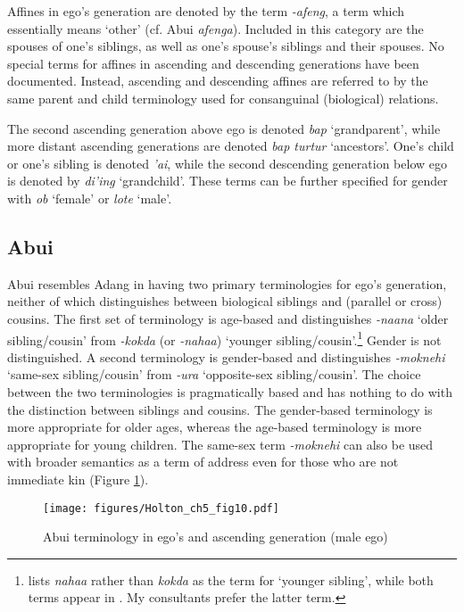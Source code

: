 Affines in ego's generation are denoted by the term \textit{{}-afeng}, a term which essentially means `other' (cf. Abui \textit{afenga}). Included in this category are the spouses of one's siblings, as well as one's spouse's siblings and their spouses. No special terms for affines in ascending and descending generations have been documented. Instead, ascending and descending affines are referred to by the same parent and child terminology used for consanguinal (biological) relations. 

The second ascending generation above ego is denoted \textit{bap} `grandparent', while more distant ascending generations are denoted \textit{bap turtur} `ancestors'. One's  child or one's sibling is denoted \textit{'ai}, while the second descending generation below ego is denoted by \textit{di'ing} `grandchild'. These terms can be further specified for gender with \textit{ob} `female' or \textit{lote} `male'. 

 
\subsection{Abui}\label{sect_abui}
Abui resembles Adang in having two primary terminologies for ego's generation, neither of which distinguishes between biological siblings and (parallel or cross) cousins. The first set of terminology is age-based and distinguishes \textit{-naana} `older sibling/cousin' from \textit{-kokda} (or \textit{-nahaa}) `younger sibling/cousin'.\footnote{\citet[56]{Nicolspeyer1940} lists \textit{nahaa} rather than \textit{kokda} as the term for `younger sibling', while both terms appear in \citet{KratochvilEtAl2008kamus}. My consultants prefer the latter term.}  Gender is not distinguished. A second terminology is gender-based and distinguishes \textit{-moknehi} `same-sex sibling/cousin' from \textit{-ura} `opposite-sex sibling/cousin'. The choice between the two terminologies is pragmatically based and has nothing to do with the distinction between siblings and cousins. The gender-based terminology is more appropriate for older ages, whereas the age-based terminology is more appropriate for young children. The same-sex term \textit{-moknehi} can also be used with broader semantics as a term of address even for those who are not immediate kin (Figure \ref{fig:5:10}).

\begin{figure}[h]
\texttt{[image: figures/Holton\_ch5\_fig10.pdf]}
\caption{Abui terminology in ego's and ascending generation (male ego)}
\label{fig:5:10}
\end{figure}  

